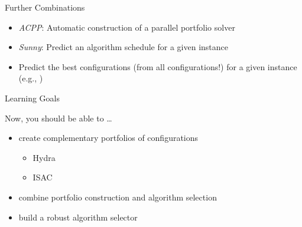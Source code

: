 \begin{frame}[c]{Further Combinations}

\begin{itemize}
  \item \textit{ACPP}: Automatic construction of a parallel portfolio solver\\ 
  \item \textit{Sunny}: Predict an algorithm schedule for a given instance\\  
  \item Predict the best configurations (from all configurations!) for a given instance (e.g., )
\end{itemize}

\end{frame}
\begin{frame}[c]{Learning Goals}

Now, you should be able to \ldots

\begin{itemize}
  \item create complementary portfolios of configurations
  \begin{itemize}
    \item Hydra
    \item ISAC
  \end{itemize}
  \item combine portfolio construction and algorithm selection
  \item build a robust algorithm selector
\end{itemize}


\end{frame}
